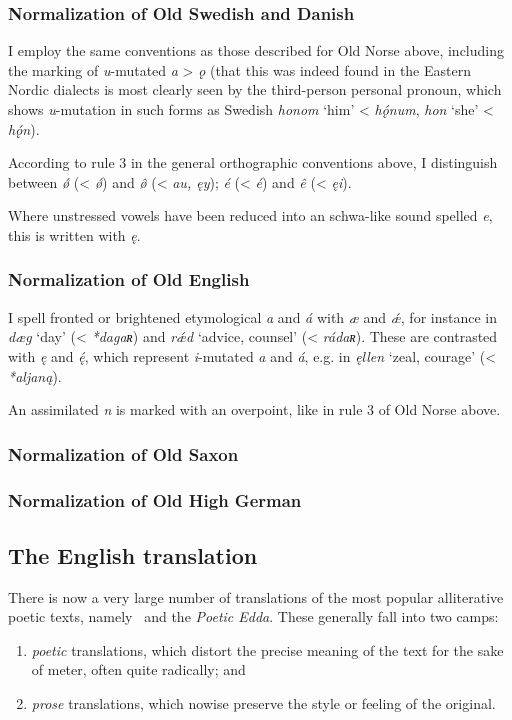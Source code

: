     \subsubsection{Normalization of Old Swedish and Danish}
    I employ the same conventions as those described for Old Norse above, including the marking of \emph{u}-mutated \emph{a} > \emph{ǫ} (that this was indeed found in the Eastern Nordic dialects is most clearly seen by the third-person personal pronoun, which shows \emph{u}-mutation in such forms as Swedish \emph{honom} ‘him’ < \emph{hǫ́num}, \emph{hon} ‘she’ < \emph{hǫ́n}).

    According to rule 3 in the general orthographic conventions above, I distinguish between \emph{ǿ} (< \emph{ǿ}) and \emph{ø̂} (< \emph{au, ęy}); \emph{é} (< \emph{é}) and \emph{ê} (< \emph{ęi}).

    Where unstressed vowels have been reduced into an schwa-like sound spelled \emph{e}, this is written with \emph{ę}.

    \subsubsection{Normalization of Old English}
    I spell fronted or brightened etymological \emph{a} and \emph{á} with \emph{æ} and \emph{ǽ}, for instance in \emph{dæg} ‘day’ (< \emph{*dagaʀ}) and \emph{rǽd} ‘advice, counsel’ (< \emph{rádaʀ}).  These are contrasted with \emph{ę} and \emph{ę́}, which represent \emph{i}-mutated \emph{a} and \emph{á}, e.g. in \emph{ęllen} ‘zeal, courage’ (< \emph{*aljaną}).

    An assimilated \emph{n} is marked with an overpoint, like in rule 3 of Old Norse above.

    \subsubsection{Normalization of Old Saxon}

    \subsubsection{Normalization of Old High German}

  \subsection{The English translation}

    There is now a very large number of translations of the most popular alliterative poetic texts, namely \Beowulf\ and the \emph{Poetic Edda}.  These generally fall into two camps:
    \begin{enumerate}
      \item \emph{poetic} translations, which distort the precise meaning of the text for the sake of meter, often quite radically; and
      \item \emph{prose} translations, which nowise preserve the style or feeling of the original.
    \end{enumerate}

